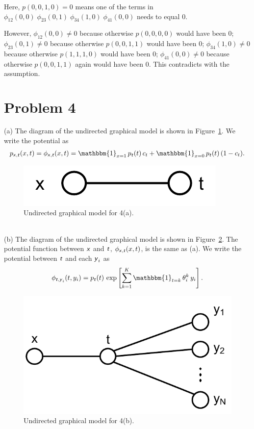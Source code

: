 \documentclass{article}
\newcommand{\s}[1]{\textsf{\textit{#1}}}
\newcommand{\qeds}{\hfill\qedsymbol}
\begin{document}
Here, $p(0, 0, 1, 0) = 0$ means one of the terms in $\phi_{12}(0,0)\;\phi_{23}(0,1)\;\phi_{34}(1,0)\;\phi_{41}(0,0)$ needs to equal $0$.

However,
$\phi_{12}(0,0) \neq 0$ because otherwise $p(0, 0, 0, 0)$ would have been $0$;
$\phi_{23}(0,1) \neq 0$ because otherwise $p(0, 0, 1, 1)$ would have been $0$;
$\phi_{34}(1,0) \neq 0$ because otherwise $p(1, 1, 1, 0)$ would have been $0$;
$\phi_{41}(0,0) \neq 0$ because otherwise $p(0, 0, 1, 1)$ again would have been $0$.
This contradicts with the assumption. \qeds  


\section*{Problem 4}
(a) The diagram of the undirected graphical model is shown in Figure~\ref{f:4a}.
We write the potential as
\begin{align*}
p_{\s{x}, \s{t}}(x, t) = \phi_{\s{x}, \s{t}}(x, t) = \mathbbm{1}_{x=1}\,p_{\s{t}}(t)\,c_t + \mathbbm{1}_{x=0}\,p_{\s{t}}(t)\,(1 - c_t).
\end{align*}
\begin{figure}[h]
  \centering
  \includegraphics[width=0.2\columnwidth]{4a.pdf}
  \caption{Undirected graphical model for 4(a).}
  \label{f:4a}
\end{figure}
\\

%
\noindent
(b) The diagram of the undirected graphical model is shown in Figure~\ref{f:4b}.
The potential function between $\s{x}$ and $\s{t}$, $\phi_{\s{x}, \s{t}}(x, t)$,
is the same as (a).
We write the potential between $\s{t}$ and each $\s{y}_i$ as
\begin{align*}
\phi_{\s{t}, \s{y}_i}(t, y_i) = p_{\s{t}}(t)\,\exp\left[\sum_{k=1}^K\mathbbm{1}_{t=k}\,\theta_i^k\,y_i\right].
\end{align*}

\begin{figure}[h]
  \centering
  \includegraphics[width=0.3\columnwidth]{4b.pdf}
  \caption{Undirected graphical model for 4(b).}
  \label{f:4b}
\end{figure}
\end{document}
